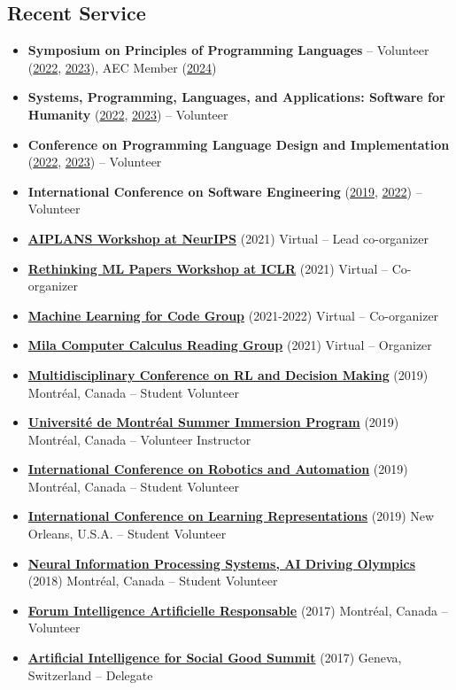 \documentclass[letterpaper,11pt]{article}
\newcommand{\resumeItem}[2]{
  \item\small{\textbf{#1}{ #2 }}
}
\newcommand{\resumeSubItem}[2]{\resumeItem{#1}{#2}}
\newcommand{\resumeSubHeadingListStart}{\begin{itemize}[leftmargin=*]}
\newcommand{\resumeSubHeadingListEnd}{\end{itemize}}
\begin{document}
\begin{justify}
\section{Recent Service}
\resumeSubHeadingListStart
\resumeSubItem{Symposium on Principles of Programming Languages}{-- Volunteer (\href{https://popl22.sigplan.org/}{2022}, \href{https://popl23.sigplan.org/}{2023}), AEC Member (\href{https://popl24.sigplan.org/}{2024})}
\resumeSubItem{Systems, Programming, Languages, and Applications: Software for Humanity}{(\href{https://2022.splashcon.org/}{2022}, \href{https://2023.splashcon.org/}{2023}) -- Volunteer}
\resumeSubItem{Conference on Programming Language Design and Implementation}{(\href{https://pldi22.sigplan.org/}{2022}, \href{https://pldi23.sigplan.org/}{2023}) -- Volunteer}
\resumeSubItem{International Conference on Software Engineering}{(\href{https://conf.researchr.org/home/icse-2019}{2019}, \href{https://conf.researchr.org/home/icse-2022}{2022}) -- Volunteer}
\resumeSubItem{\href{https://aiplans.github.io/}{AIPLANS Workshop at NeurIPS}}{(2021) Virtual -- Lead co-organizer}
\resumeSubItem{\href{https://rethinkingmlpapers.github.io/}{Rethinking ML Papers Workshop at ICLR}}{(2021) Virtual -- Co-organizer}
\resumeSubItem{\href{https://ml4code-mtl.github.io/}{Machine Learning for Code Group}}{(2021-2022) Virtual -- Co-organizer}
\resumeSubItem{\href{https://compcalc.github.io/}{Mila Computer Calculus Reading Group}}{(2021) Virtual -- Organizer}
\resumeSubItem{\href{http://rldm.org/}{Multidisciplinary Conference on RL and Decision Making}}{(2019) Montr\'eal, Canada -- Student Volunteer}
\resumeSubItem{\href{https://admission.umontreal.ca/en/summer-immersion-program/a-summer-in-montreal/}{Universit\'e de Montr\'eal Summer Immersion Program}}{(2019) Montr\'eal, Canada -- Volunteer Instructor}
\resumeSubItem{\href{https://www.icra2019.org/}{International Conference on Robotics and Automation}}{(2019)  Montr\'eal, Canada -- Student Volunteer}
\resumeSubItem{\href{https://iclr.cc/Conferences/2019}{International Conference on Learning Representations}}{(2019) New Orleans, U.S.A. -- Student Volunteer}
\resumeSubItem{\href{https://www.duckietown.org/research/ai-driving-olympics}{Neural Information Processing Systems, AI Driving Olympics}}{(2018) Montr\'eal, Canada -- Student Volunteer}
\resumeSubItem{\href{https://sites.grenadine.co/sites/forumiaresponsableumontreal/fr/forumiaresponsableumontreal}{Forum Intelligence Artificielle Responsable}}{(2017) Montr\'eal, Canada -- Volunteer}
\resumeSubItem{\href{https://aiforgood.itu.int/}{Artificial Intelligence for Social Good Summit}}{(2017) Geneva, Switzerland -- Delegate}
\resumeSubHeadingListEnd


\end{justify}
\end{document}
